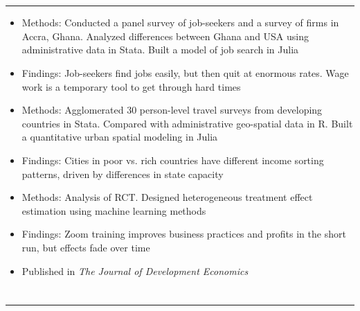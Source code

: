 \documentclass[10.5pt]{article}
\newenvironment{customitemize}
{ \begin{itemize}[leftmargin=\parindent, topsep = 0.2pt, itemsep = -3pt] }
{\end{itemize} }
\begin{document}
\section*{}
\noindent \rule{\textwidth}{1pt} 
\begin{customitemize}
\item Methods: Conducted a panel survey of job-seekers and a survey of firms in Accra, Ghana. Analyzed differences between Ghana and USA using administrative data in Stata. Built a model of job search in Julia
\item Findings: Job-seekers find jobs easily, but then quit at enormous rates. Wage work is a temporary tool to get through hard times 
\end{customitemize}
\begin{customitemize}
	\item Methods: Agglomerated 30 person-level travel surveys from developing countries in Stata. Compared with administrative geo-spatial data in R. Built a quantitative urban spatial modeling in Julia
	\item Findings: Cities in poor vs. rich countries have different income sorting patterns, driven by differences in state capacity
\end{customitemize}
\begin{customitemize}
	\item Methods: Analysis of RCT. Designed heterogeneous treatment effect estimation using machine learning methods
	\item Findings: Zoom training improves business practices and profits in the short run, but effects fade over time
	\item Published in \textit{The Journal of Development Economics}
\end{customitemize}

\section*{} 
\noindent \rule{\textwidth}{1pt} 
\end{document}
